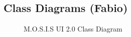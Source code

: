 \subsection{Class Diagrams (Fabio)}
\begin{figure}[ht!]
	\caption{M.O.S.I.S UI 2.0 Class Diagram}
\end{figure}